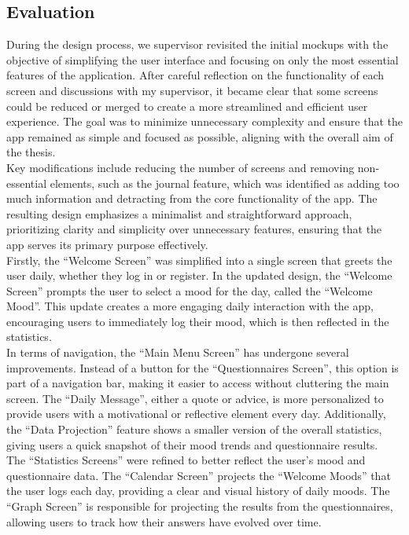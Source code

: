 \subsection{Evaluation}

During the design process, we supervisor revisited the initial mockups with the objective of simplifying the user interface and focusing on only the most essential features of the application. After careful reflection on the functionality of each screen and discussions with my supervisor, it became clear that some screens could be reduced or merged to create a more streamlined and efficient user experience. The goal was to minimize unnecessary complexity and ensure that the app remained as simple and focused as possible, aligning with the overall aim of the thesis.\vspace{5mm} \\
Key modifications include reducing the number of screens and removing non-essential elements, such as the journal feature, which was identified as adding too much information and detracting from the core functionality of the app. The resulting design emphasizes a minimalist and straightforward approach, prioritizing clarity and simplicity over unnecessary features, ensuring that the app serves its primary purpose effectively.\vspace{5mm} \\
Firstly, the ``Welcome Screen'' was simplified into a single screen that greets the user daily, whether they log in or register. In the updated design, the ``Welcome Screen'' prompts the user to select a mood for the day, called the ``Welcome Mood''. This update creates a more engaging daily interaction with the app, encouraging users to immediately log their mood, which is then reflected in the statistics.\vspace{5mm} \\
In terms of navigation, the ``Main Menu Screen'' has undergone several improvements. Instead of a button for the ``Questionnaires Screen'', this option is part of a navigation bar, making it easier to access without cluttering the main screen. The ``Daily Message'', either a quote or advice, is more personalized to provide users with a motivational or reflective element every day. Additionally, the ``Data Projection'' feature shows a smaller version of the overall statistics, giving users a quick snapshot of their mood trends and questionnaire results.\vspace{5mm} \\
The ``Statistics Screens'' were refined to better reflect the user's mood and questionnaire data. The ``Calendar Screen'' projects the ``Welcome Moods'' that the user logs each day, providing a clear and visual history of daily moods. The ``Graph Screen'' is responsible for projecting the results from the questionnaires, allowing users to track how their answers have evolved over time.\vspace{5mm} \\
